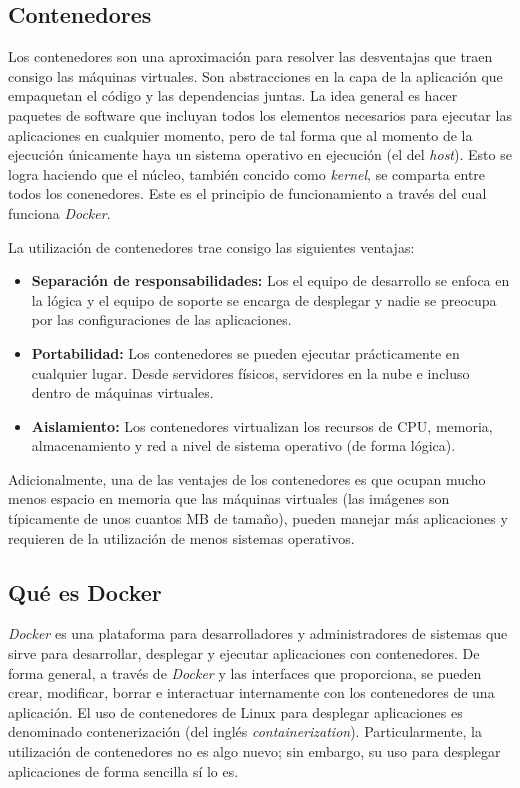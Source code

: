 \documentclass[12pt, letterpaper]{article}
\begin{document}
\subsection{Contenedores}
Los contenedores son una aproximación para resolver las desventajas que traen 
consigo las máquinas virtuales. Son abstracciones en la capa de la aplicación 
que empaquetan el código y las dependencias juntas. La idea general es hacer 
paquetes de software que incluyan todos los elementos necesarios para ejecutar 
las aplicaciones en cualquier momento, pero de tal forma que al momento de la 
ejecución únicamente haya un sistema operativo en ejecución (el del 
\textit{host}).  Esto se logra haciendo que el núcleo, también concido como 
\textit{kernel}, se comparta entre todos los conenedores. Este es el principio 
de funcionamiento a través del cual funciona \textit{Docker}.

La utilización de contenedores trae consigo las siguientes ventajas:
\begin{itemize}
  \item \textbf{Separación de responsabilidades:} Los el equipo de desarrollo 
  se enfoca en la lógica y el equipo de soporte se encarga de desplegar y 
  nadie se preocupa por las configuraciones de las aplicaciones.
  \item \textbf{Portabilidad:} Los contenedores se pueden ejecutar 
  prácticamente en cualquier lugar. Desde servidores físicos, servidores en la 
    nube e incluso dentro de  máquinas virtuales.
  \item \textbf{Aislamiento:} Los contenedores virtualizan los recursos de 
  CPU, memoria, almacenamiento y red a nivel de sistema operativo (de forma 
  lógica).
\end{itemize}

Adicionalmente, una de las ventajes de los contenedores es que ocupan mucho 
menos espacio en memoria que las máquinas virtuales (las imágenes son 
típicamente de unos cuantos MB de tamaño), pueden manejar más aplicaciones y 
requieren de la utilización de menos sistemas operativos.

\subsection{Qué es Docker}
\textit{Docker} es una plataforma para desarrolladores y administradores de 
sistemas que sirve para desarrollar, desplegar y ejecutar aplicaciones con 
contenedores. De forma general, a través de \textit{Docker} y las interfaces 
que proporciona, se pueden crear, modificar, borrar e interactuar internamente 
con los contenedores de una aplicación. El uso de contenedores de Linux para 
desplegar aplicaciones es denominado contenerización (del inglés 
\textit{containerization}).  Particularmente, la utilización de contenedores 
no es algo nuevo; sin embargo, su uso para desplegar aplicaciones de forma 
sencilla sí lo es.
\end{document}
